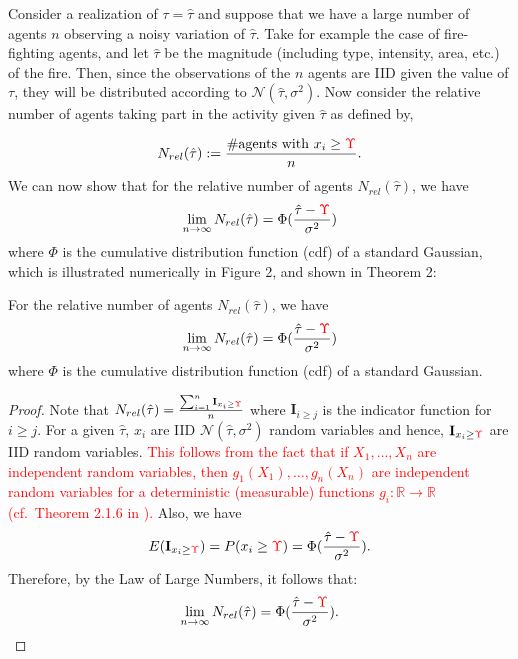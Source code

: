 \documentclass[smallextended]{svjour3}       %
\newcommand{\edit}[1]{\textcolor{red}{#1}}
\def\R{\mathbb{R}}    %
\def\td{\edit{\Upsilon}}   %
\begin{document}
Consider a realization of $\tau=\hat{\tau}$ and suppose that we have a large number of agents $n$ observing a noisy variation of $\hat{\tau}$. Take for example the case of fire-fighting agents, and let $\hat{\tau}$ be the magnitude (including type, intensity, area, etc.) of the fire. Then, since the observations of the $n$ agents are IID given the value of $\tau$, they will be distributed according to $\mathcal{N}(\hat{\tau},\sigma^2)$. Now consider the relative number of agents taking part in the activity given $\hat{\tau}$ as defined by,

\begin{equation*}
	N_{rel}(\hat{\tau}):=\frac{\#\text{agents with }x_i\geq \td}{n}.
\end{equation*}
We can now show that for the relative number of agents $N_{rel}(\hat{\tau})$, we have
\begin{equation}
\lim_{n\to\infty}N_{rel}(\hat{\tau})=\Phi(\frac{\hat{\tau}-\td}{\sigma^2})
\end{equation}
where $\Phi$ is the cumulative distribution function (cdf) of a standard Gaussian, which is illustrated numerically in Figure 2, and shown in Theorem 2:  

\begin{theorem}\label{thrm:relativefrequency}
For the relative number of agents $N_{rel}(\hat{\tau})$, we have
\begin{equation}
\lim_{n\to\infty}N_{rel}(\hat{\tau})=\Phi(\frac{\hat{\tau}-\td}{\sigma^2})
\end{equation}
where $\Phi$ is the cumulative distribution function (cdf) of a standard Gaussian. 
\end{theorem}
\begin{proof}
Note that $N_{rel}(\hat{\tau})=\frac{\sum_{i=1}^n\mathbf{I}_{x_i\geq \td}}{n}$ where $\mathbf{I}_{i\geq j}$ is the indicator function for $i\geq j$. For a given $\hat{\tau}$, $x_i$ are IID $\mathcal{N}(\hat{\tau},\sigma^2)$ random variables and hence, $\mathbf{I}_{x_i\geq \td}$ are IID random variables. \edit{This follows from the fact that if $X_1,\ldots,X_n$ are independent random variables, then $g_1(X_1),\ldots,g_n(X_n)$ are independent random variables for a deterministic (measurable) functions $g_i:\R\to\R$ (cf.\ Theorem 2.1.6 in \cite{durrett2010probability}).} Also, we have 
\[E(\mathbf{I}_{x_i\geq \td})=P(x_i\geq \td)=\Phi(\frac{\hat{\tau}-\td}{\sigma^2}).\]
 Therefore, by the Law of Large Numbers, it follows that:
\begin{align*}
\lim_{n\to\infty}N_{rel}(\hat{\tau})=\Phi(\frac{\hat{\tau}-\td}{\sigma^2}).
\end{align*}
\end{proof}
\end{document}
